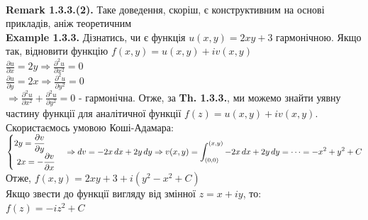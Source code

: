 \documentclass[a4paper, 14pt]{extarticle}
\def\hugespace{\vspace{5mm} \\}
\begin{document}
	\hugespace
	\textbf{Remark 1.3.3.(2).} Таке доведення, скоріш, є конструктивним на основі прикладів, аніж теоретичним
	\hugespace
	\textbf{Example 1.3.3.} Дізнатись, чи є функція $u(x,y)=2xy+3$ гармонічною. Якщо так, відновити функцію $f(x,y) = u(x,y)+iv(x,y)$\\
	$\displaystyle\frac{\partial u}{\partial x} = 2y \Rightarrow \frac{\partial^2 u}{\partial x^2} = 0$\\
	$\displaystyle\frac{\partial u}{\partial y} = 2x \Rightarrow \frac{\partial^2 u}{\partial y^2} = 0$\\
	$\Rightarrow \displaystyle\frac{\partial^2 u}{\partial x^2} + \frac{\partial^2 u}{\partial y^2} = 0$ - гармонічна. Отже, за \textbf{Th. 1.3.3.}, ми можемо знайти уявну частину функції для аналітичної функції $f(z)=u(x,y)+iv(x,y)$. Скористаємось умовою Коші-Адамара:\\
		$
	\begin{cases}
		\displaystyle 2y = \frac{\partial v}{\partial y}\\
		\displaystyle\ 2x = -\frac{\partial v}{\partial x}\\
	\end{cases} \Rightarrow dv = -2x\,dx + 2y\,dy\\
	\displaystyle\Rightarrow v(x,y) = \int_{(0,0)}^{(x,y)}-2x\,dx+2y\,dy=\cdots=-x^2+y^2+C
	$\\
	Отже, $f(x,y) = 2xy+3+i(y^2-x^2+C)$\\
	Якщо звести до функції вигляду від змінної $z = x+iy$, то:\\
	$f(z) = -iz^2+C$
	\hugespace
	
\end{document}

